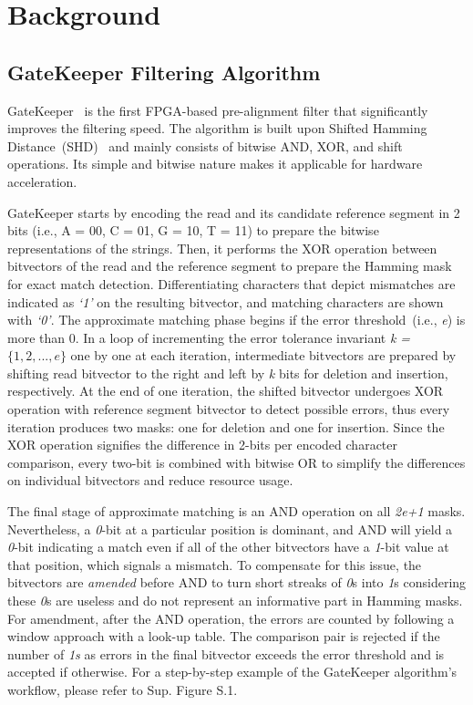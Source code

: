 \section{Background} 
\subsection{GateKeeper Filtering Algorithm}

GateKeeper~\cite{Alser2017} is the first FPGA-based pre-alignment filter that significantly improves the filtering speed. The algorithm is built upon Shifted Hamming Distance~(SHD)~\cite{xin2015shifted} and mainly consists of bitwise AND, XOR, and shift operations. Its simple and bitwise nature makes it applicable for hardware acceleration.

GateKeeper starts by encoding the read and its candidate reference segment in 2 bits (i.e., A = 00, C = 01, G = 10, T = 11) to prepare the bitwise representations of the strings. Then, it performs the XOR operation between bitvectors of the read and the reference segment to prepare the Hamming mask for exact match detection. Differentiating characters that depict mismatches are indicated as \textit{`1'} on the resulting bitvector, and matching characters are shown with \textit{`0'}. The approximate matching phase begins if the error threshold~(i.e., \textit{e}) is more than 0. In a loop of incrementing the error tolerance invariant \textit{k = $\{1,2,...,e\}$} one by one at each iteration, intermediate bitvectors are prepared by shifting read bitvector to the right and left by \textit{k} bits for deletion and insertion, respectively.
At the end of one iteration, the shifted bitvector undergoes XOR operation with reference segment bitvector to detect possible errors, thus every iteration produces two masks: one for deletion and one for insertion. Since the XOR operation signifies the difference in 2-bits per encoded character comparison, every two-bit is combined with bitwise OR to simplify the differences on individual bitvectors and reduce resource usage. 

The final stage of approximate matching is an AND operation on all \textit{2e+1} masks. Nevertheless, a \textit{0}-bit at a particular position is dominant, and AND will yield a \textit{0}-bit indicating a match even if all of the other bitvectors have a \textit{1}-bit value at that position, which signals a mismatch.
To compensate for this issue, the bitvectors are \textit{amended} before AND to turn short streaks of \textit{0}s into \textit{1}s considering these \textit {0}s are useless and do not represent an informative part in Hamming masks. For amendment, after the AND operation, the errors are counted by following a window approach with a look-up table. The comparison pair is rejected if the number of \textit{1s} as errors in the final bitvector exceeds the error threshold and is accepted if otherwise. For a step-by-step example of the GateKeeper algorithm's workflow, please refer to Sup. Figure S.1.  

